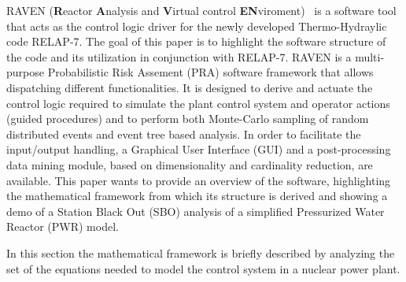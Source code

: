 \documentclass{mc2013}
\begin{document}
\setlength{\baselineskip}{14pt}
\normalsize



RAVEN (\textbf{R}eactor \textbf{A}nalysis and \textbf{V}irtual control \textbf{EN}viroment)~\cite{ravenFY12,mandelliANS2012} is a software tool that acts as the control logic driver for the newly developed Thermo-Hydraylic code RELAP-7. The goal of this paper is to highlight the software structure of the code and its utilization in conjunction with RELAP-7. RAVEN is a multi-purpose Probabilistic Risk Assement (PRA) software framework that allows dispatching different functionalities. 
It is designed to derive and actuate the control logic required to simulate the plant control system and operator actions (guided procedures) and to perform both Monte-Carlo sampling of random distributed events and event tree based analysis. 
In order to facilitate the input/output handling, a Graphical User Interface (GUI) and a post-processing data mining module, based on dimensionality and cardinality reduction, are available.
This paper wants to provide an overview of the software, highlighting the mathematical framework from which its structure is derived and showing a demo of a Station Black Out (SBO) analysis of a simplified Pressurized Water Reactor (PWR) model.

\label{sec:mathFramework}

In this section the mathematical framework is briefly described by analyzing the set of the equations needed to model the control system in a nuclear power plant.
\end{document}
